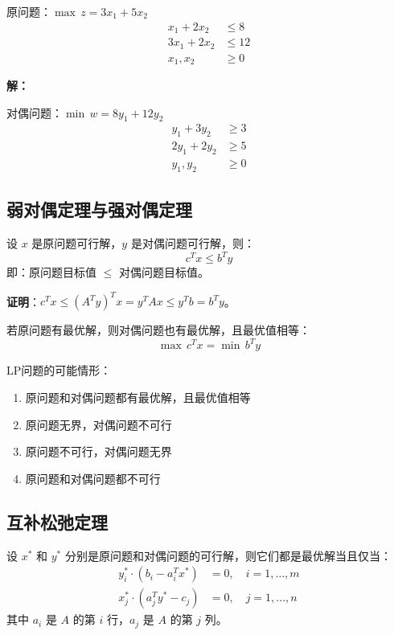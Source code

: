 \begin{example}[写对偶问题]
原问题：$\max \, z = 3x_1 + 5x_2$
\begin{align*}
x_1 + 2x_2 &\leq 8 \\
3x_1 + 2x_2 &\leq 12 \\
x_1, x_2 &\geq 0
\end{align*}

\textbf{解：}

对偶问题：$\min \, w = 8y_1 + 12y_2$
\begin{align*}
y_1 + 3y_2 &\geq 3 \\
2y_1 + 2y_2 &\geq 5 \\
y_1, y_2 &\geq 0
\end{align*}
\end{example}

\subsection{弱对偶定理与强对偶定理}

\begin{theorem}[弱对偶定理]
设 $x$ 是原问题可行解，$y$ 是对偶问题可行解，则：
\[
c^T x \leq b^T y
\]
即：原问题目标值 $\leq$ 对偶问题目标值。
\end{theorem}

\textbf{证明}：$c^T x \leq (A^T y)^T x = y^T A x \leq y^T b = b^T y$。

\begin{theorem}[强对偶定理]
若原问题有最优解，则对偶问题也有最优解，且最优值相等：
\[
\max \, c^T x = \min \, b^T y
\]
\end{theorem}

\begin{corollary}
LP问题的可能情形：
\begin{enumerate}
    \item 原问题和对偶问题都有最优解，且最优值相等
    \item 原问题无界，对偶问题不可行
    \item 原问题不可行，对偶问题无界
    \item 原问题和对偶问题都不可行
\end{enumerate}
\end{corollary}

\subsection{互补松弛定理}

\begin{theorem}[互补松弛条件]
设 $x^*$ 和 $y^*$ 分别是原问题和对偶问题的可行解，则它们都是最优解当且仅当：
\begin{align*}
y_i^* \cdot (b_i - a_i^T x^*) &= 0, \quad i = 1, \ldots, m \\
x_j^* \cdot (a_j^T y^* - c_j) &= 0, \quad j = 1, \ldots, n
\end{align*}
其中 $a_i$ 是 $A$ 的第 $i$ 行，$a_j$ 是 $A$ 的第 $j$ 列。
\end{theorem}

